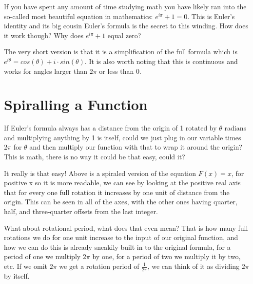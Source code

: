 \documentclass[12pt]{article}
\begin{document}
If you have spent any amount of time studying math you have likely ran into the so-called most beautiful equation in mathematics: $e^{i\pi}+1=0$. This is Euler's identity and its big cousin Euler's formula is the secret to this winding. How does it work though?  Why does $e^{i\pi}+1$ equal zero?

\unitCircle

The very short version is that it is a simplification of the full formula which is $e^{i\theta}=cos(\theta)+i\cdot sin(\theta)$. It is also worth noting that this is continuous and works for angles larger than $2\pi$ or less than 0.

\pagebreak

\section{Spiralling a Function}

If Euler's formula always has a distance from the origin of 1 rotated by $\theta$ radians and multiplying anything by 1 is itself, could we just plug in our variable times $2\pi$ for $\theta$ and then multiply our function with that to wrap it around the origin? This is math, there is no way it could be that easy, could it?

\begin{multicols}{2}
\end{multicols}

It really is that easy! Above is a spiraled version of the equation $F(x) = x$, for positive x so it is more readable, we can see by looking at the positive real axis that for every one full rotation it increases by one unit of distance from the origin. This can be seen in all of the axes, with the other ones having quarter, half, and three-quarter offsets from the last integer.

What about rotational period, what does that even mean? That is how many full rotations we do for one unit increase to the input of our original function, and how we can do this is already sneakily built in to the original formula, for a period of one we multiply $2\pi$ by one, for a period of two we multiply it by two, etc. If we omit $2\pi$ we get a rotation period of $\frac{1}{2\pi}$, we can think of it as dividing $2\pi$ by itself.

\begin{multicols}{2}
\end{multicols}
\end{document}
